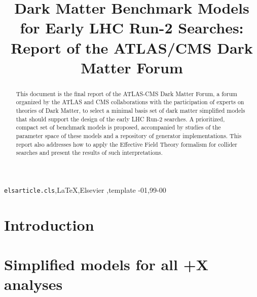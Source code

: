 \documentclass[review]{elsarticle}
\begin{document}
\begin{frontmatter}

\title{Dark Matter Benchmark Models for Early LHC Run-2 Searches: Report of the ATLAS/CMS Dark Matter Forum}






\begin{abstract}
This document is the final report of the ATLAS-CMS Dark Matter Forum, a forum organized by the ATLAS and CMS collaborations with the participation of experts on theories of Dark Matter, to select a minimal basis set of dark matter simplified models that should support the design of the early LHC Run-2 searches. A prioritized, compact set of benchmark models is proposed, accompanied by studies of the parameter space of these models and a repository of generator implementations. This report also addresses how to apply the Effective Field Theory formalism for collider searches and present the results of such interpretations.
\end{abstract}

\begin{keyword}
\texttt{elsarticle.cls}\sep \LaTeX\sep Elsevier \sep template
-01\sep  99-00
\end{keyword}

\end{frontmatter}



\linenumbers
\tableofcontents

\section{Introduction}
\label{sec:Introduction}


\section{\texorpdfstring{Simplified models for all \MET+X analyses}{Simplified models for all MET+X analyses}}
\label{subsec:MonojetLikeModels}

\end{document}
